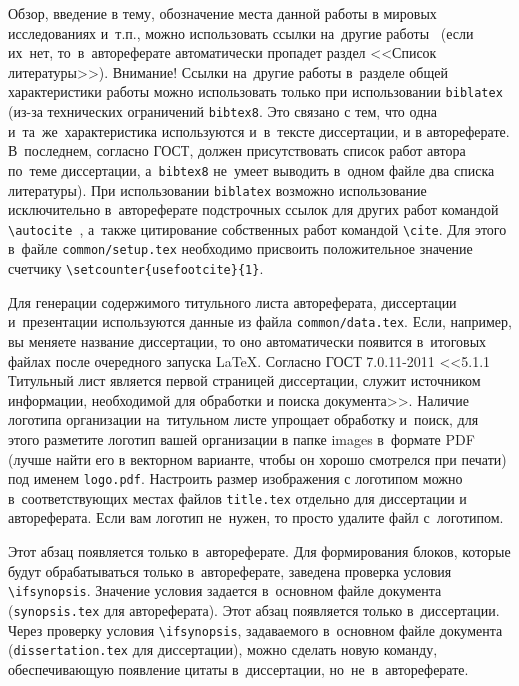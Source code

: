 
{\actuality} Обзор, введение в тему, обозначение места данной работы в
мировых исследованиях и~т.\:п., можно использовать ссылки на~другие
работы~\autocite{Gosele1999161,Lermontov}
(если их~нет, то~в~автореферате
автоматически пропадет раздел <<Список литературы>>). Внимание! Ссылки
на~другие работы в~разделе общей характеристики работы можно
использовать только при использовании \verb!biblatex! (из-за технических
ограничений \verb!bibtex8!. Это связано с тем, что одна
и~та~же~характеристика используются и~в~тексте диссертации, и в
автореферате. В~последнем, согласно ГОСТ, должен присутствовать список
работ автора по~теме диссертации, а~\verb!bibtex8! не~умеет выводить в~одном
файле два списка литературы).
При использовании \verb!biblatex! возможно использование исключительно
в~автореферате подстрочных ссылок
для других работ командой \verb!\autocite!~\autocite{Marketing}, а~также цитирование
собственных работ командой \verb!\cite!. Для этого в~файле
\verb!common/setup.tex! необходимо присвоить положительное значение
счетчику \verb!\setcounter{usefootcite}{1}!.

Для генерации содержимого титульного листа автореферата, диссертации
и~презентации используются данные из файла \verb!common/data.tex!. Если,
например, вы меняете название диссертации, то оно автоматически
появится в~итоговых файлах после очередного запуска \LaTeX. Согласно
ГОСТ 7.0.11-2011 <<5.1.1 Титульный лист является первой страницей
диссертации, служит источником информации, необходимой для обработки и
поиска документа>>. Наличие логотипа организации на~титульном листе
упрощает обработку и~поиск, для этого разметите логотип вашей
организации в папке images в~формате PDF (лучше найти его в векторном
варианте, чтобы он хорошо смотрелся при печати) под именем
\verb!logo.pdf!. Настроить размер изображения с логотипом можно
в~соответствующих местах файлов \verb!title.tex!  отдельно для
диссертации и автореферата. Если вам логотип не~нужен, то просто
удалите файл с~логотипом.

\ifsynopsis
Этот абзац появляется только в~автореферате.
Для формирования блоков, которые будут обрабатываться только в~автореферате,
заведена проверка условия \verb!\!\verb!ifsynopsis!.
Значение условия задается в~основном файле документа (\verb!synopsis.tex! для
автореферата).
\else
Этот абзац появляется только в~диссертации.
Через проверку условия \verb!\!\verb!ifsynopsis!, задаваемого в~основном файле
документа (\verb!dissertation.tex! для диссертации), можно сделать новую
команду, обеспечивающую появление цитаты в~диссертации, но~не~в~автореферате.
\fi

